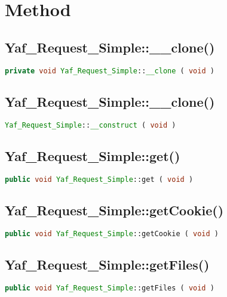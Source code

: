 \section{Method}


\subsection{Yaf\_Request\_Simple::\_\_clone()}





\begin{lstlisting}[language=PHP]
private void Yaf_Request_Simple::__clone ( void )
\end{lstlisting}

\subsection{Yaf\_Request\_Simple::\_\_clone()}


\begin{lstlisting}[language=PHP]
Yaf_Request_Simple::__construct ( void )
\end{lstlisting}


\subsection{Yaf\_Request\_Simple::get()}


\begin{lstlisting}[language=PHP]
public void Yaf_Request_Simple::get ( void )
\end{lstlisting}

\subsection{Yaf\_Request\_Simple::getCookie()}


\begin{lstlisting}[language=PHP]
public void Yaf_Request_Simple::getCookie ( void )
\end{lstlisting}

\subsection{Yaf\_Request\_Simple::getFiles()}


\begin{lstlisting}[language=PHP]
public void Yaf_Request_Simple::getFiles ( void )
\end{lstlisting}

